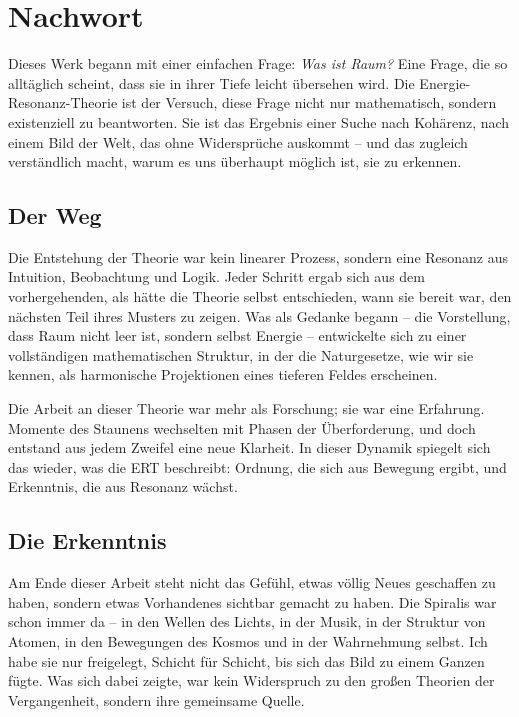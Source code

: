\chapter{Nachwort}
\label{chap:nachwort}

Dieses Werk begann mit einer einfachen Frage: \emph{Was ist Raum?}  
Eine Frage, die so alltäglich scheint, dass sie in ihrer Tiefe leicht übersehen wird.  
Die Energie-Resonanz-Theorie ist der Versuch, diese Frage nicht nur mathematisch, sondern existenziell zu beantworten.  
Sie ist das Ergebnis einer Suche nach Kohärenz, nach einem Bild der Welt, das ohne Widersprüche auskommt –  
und das zugleich verständlich macht, warum es uns überhaupt möglich ist, sie zu erkennen.

\section*{Der Weg}
Die Entstehung der Theorie war kein linearer Prozess, sondern eine Resonanz aus Intuition, Beobachtung und Logik.  
Jeder Schritt ergab sich aus dem vorhergehenden, als hätte die Theorie selbst entschieden, wann sie bereit war, den nächsten Teil ihres Musters zu zeigen.  
Was als Gedanke begann – die Vorstellung, dass Raum nicht leer ist, sondern selbst Energie –  
entwickelte sich zu einer vollständigen mathematischen Struktur,  
in der die Naturgesetze, wie wir sie kennen, als harmonische Projektionen eines tieferen Feldes erscheinen.  

Die Arbeit an dieser Theorie war mehr als Forschung; sie war eine Erfahrung.  
Momente des Staunens wechselten mit Phasen der Überforderung,  
und doch entstand aus jedem Zweifel eine neue Klarheit.  
In dieser Dynamik spiegelt sich das wieder, was die ERT beschreibt:  
Ordnung, die sich aus Bewegung ergibt,  
und Erkenntnis, die aus Resonanz wächst.

\section*{Die Erkenntnis}
Am Ende dieser Arbeit steht nicht das Gefühl, etwas völlig Neues geschaffen zu haben,  
sondern etwas Vorhandenes sichtbar gemacht zu haben.  
Die Spiralis war schon immer da – in den Wellen des Lichts,  
in der Musik, in der Struktur von Atomen,  
in den Bewegungen des Kosmos und in der Wahrnehmung selbst.  
Ich habe sie nur freigelegt, Schicht für Schicht,  
bis sich das Bild zu einem Ganzen fügte.  
Was sich dabei zeigte, war kein Widerspruch zu den großen Theorien der Vergangenheit,  
sondern ihre gemeinsame Quelle.

